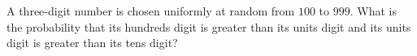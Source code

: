 A three-digit number is chosen uniformly at random from $100$ to $999$. What is the probability that its hundreds digit is greater than its units digit and its units digit is greater than its tens digit?
